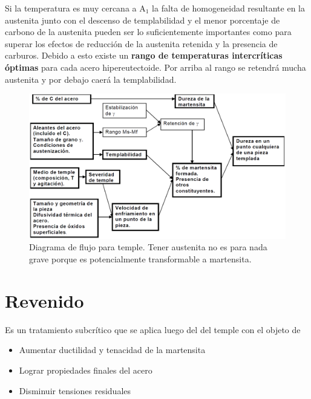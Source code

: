 \documentclass{article}
\newcommand{\Aone}{A\ensuremath{_{1}}}
\begin{document}
Si la temperatura es muy cercana a \Aone{} la falta de homogeneidad resultante en la austenita junto con el descenso de templabilidad y el menor porcentaje de carbono de la austenita pueden ser lo suficientemente importantes como para superar los efectos de reducción de la austenita retenida y la presencia de carburos. Debido a esto existe un \textbf{rango de temperaturas intercríticas óptimas} para cada acero hipereutectoide. Por arriba al rango se retendrá mucha austenita y por debajo caerá la templabilidad.

\begin{figure}[htb!]
    \centering
    \includegraphics[width=.9\textwidth]{fig/flowdiagTemple.PNG}
    \caption{Diagrama de flujo para temple. Tener austenita no es para nada grave porque es potencialmente transformable a martensita.}
    \label{fig:flowdiagTemple}
\end{figure}

\section{Revenido}
Es un tratamiento subcrítico que se aplica luego del del temple con el objeto de 
\begin{itemize}
    \item Aumentar ductilidad y tenacidad de la martensita
    \item Lograr propiedades finales del acero
    \item Disminuir tensiones residuales
\end{itemize}
\end{document}

